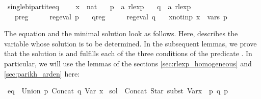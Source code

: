 \begin{isabellebody}
\begin{isamarkuptext}
\end{isamarkuptext}\isamarkuptrue%
\isamarkupfalse%
\ single{\isacharunderscore}{\kern0pt}bipartite{\isacharunderscore}{\kern0pt}eq\ {\isacharequal}{\kern0pt}\isanewline
\ \ \ x\ {\isacharcolon}{\kern0pt}{\isacharcolon}{\kern0pt}\ {\isachardoublequoteopen}nat{\isachardoublequoteclose}\isanewline
\ \ \ p\ {\isacharcolon}{\kern0pt}{\isacharcolon}{\kern0pt}\ {\isachardoublequoteopen}{\isacharprime}{\kern0pt}a\ rlexp{\isachardoublequoteclose}\isanewline
\ \ \ q\ {\isacharcolon}{\kern0pt}{\isacharcolon}{\kern0pt}\ {\isachardoublequoteopen}{\isacharprime}{\kern0pt}a\ rlexp{\isachardoublequoteclose}\isanewline
\ \ \ p{\isacharunderscore}{\kern0pt}reg{\isacharcolon}{\kern0pt}\ \ \ \ \ \ {\isachardoublequoteopen}reg{\isacharunderscore}{\kern0pt}eval\ p{\isachardoublequoteclose}\isanewline
\ \ \ q{\isacharunderscore}{\kern0pt}reg{\isacharcolon}{\kern0pt}\ \ \ \ \ \ {\isachardoublequoteopen}reg{\isacharunderscore}{\kern0pt}eval\ q{\isachardoublequoteclose}\isanewline
\ \ \ x{\isacharunderscore}{\kern0pt}not{\isacharunderscore}{\kern0pt}in{\isacharunderscore}{\kern0pt}p{\isacharcolon}{\kern0pt}\ {\isachardoublequoteopen}x\ {\isasymnotin}\ vars\ p{\isachardoublequoteclose}\isanewline
{}%
\begin{isamarkuptext}%
The equation and the minimal solution look as follows. Here,  describes the variable whose
solution is to be determined. In the subsequent lemmas, we prove that the solution is 
and fulfills each of the three conditions of the predicate .
In particular, we will use the lemmas of the sections \ref{sec:rlexp_homogeneous} and
\ref{sec:parikh_arden} here:%
\end{isamarkuptext}\isamarkuptrue%
\isamarkupfalse%
\ {\isachardoublequoteopen}eq\ {\isasymequiv}\ Union\ p\ {\isacharparenleft}{\kern0pt}Concat\ q\ {\isacharparenleft}{\kern0pt}Var\ x{\isacharparenright}{\kern0pt}{\isacharparenright}{\kern0pt}{\isachardoublequoteclose}\isanewline
{}\isamarkupfalse%
\ {\isachardoublequoteopen}sol\ {\isasymequiv}\ Concat\ {\isacharparenleft}{\kern0pt}Star\ {\isacharparenleft}{\kern0pt}subst\ {\isacharparenleft}{\kern0pt}Var{\isacharparenleft}{\kern0pt}x\ {\isacharcolon}{\kern0pt}{\isacharequal}{\kern0pt}\ p{\isacharparenright}{\kern0pt}{\isacharparenright}{\kern0pt}\ q{\isacharparenright}{\kern0pt}{\isacharparenright}{\kern0pt}\ p{\isachardoublequoteclose}\isanewline

\end{isabellebody}
